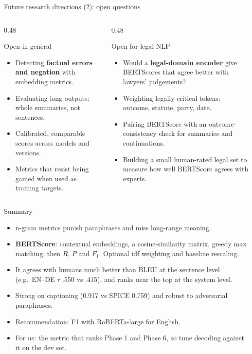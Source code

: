 \documentclass[aspectratio=169,11pt]{beamer}
\begin{document}
\begin{frame}{Future research directions (2): open questions}
  \begin{columns}[T]
    \begin{column}{0.48\textwidth}
      \begin{block}{Open in general}
        \small
        \begin{itemize}
          \item Detecting \textbf{factual errors and negation} with embedding metrics.
          \item Evaluating long outputs: whole summaries, not sentences.
          \item Calibrated, comparable scores across models and versions.
          \item Metrics that resist being gamed when used as training targets.
        \end{itemize}
      \end{block}
    \end{column}
    \begin{column}{0.48\textwidth}
      \begin{exampleblock}{Open for legal NLP}
        \small
        \begin{itemize}
          \item Would a \textbf{legal-domain encoder} give BERTScores that agree better with lawyers' judgements?
          \item Weighting legally critical tokens: outcome, statute, party, date.
          \item Pairing BERTScore with an outcome-consistency check for summaries and continuations.
          \item Building a small human-rated legal set to measure how well BERTScore agrees with experts.
        \end{itemize}
      \end{exampleblock}
    \end{column}
  \end{columns}
\end{frame}

\begin{frame}{Summary}
  \begin{itemize}
    \item n-gram metrics punish paraphrases and miss long-range meaning.
    \item \textbf{BERTScore}: contextual embeddings, a cosine-similarity matrix, greedy max matching, then $R$, $P$ and $F_1$. Optional idf weighting and baseline rescaling.
    \item It agrees with humans much better than BLEU at the sentence level (e.g.\ EN--DE $\tau$ .550 vs .415), and ranks near the top at the system level.
    \item Strong on captioning (0.917 vs SPICE 0.759) and robust to adversarial paraphrases.
    \item Recommendation: F1 with RoBERTa-large for English.
    \item For us: the metric that ranks Phase 1 and Phase 6, so tune decoding against it on the dev set.
  \end{itemize}
\end{frame}
\end{document}
